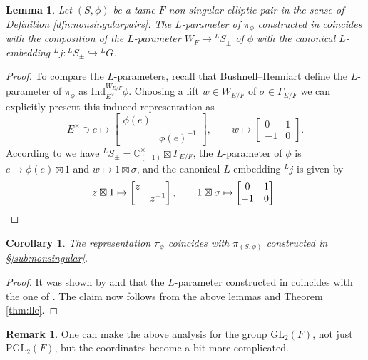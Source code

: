 \documentclass{article}
\def\tx#1{\textrm{#1}}
\def\C{\mathbb{C}}
\newtheorem{lem}[thm]{Lemma}
\newtheorem{cor}[thm]{Corollary}
\theoremstyle{definition}
\newtheorem{rem}[thm]{Remark}
\numberwithin{equation}{subsection}
\renewcommand{\-}{\hyp{}}
\begin{document}
\begin{lem}
	Let $(S,\phi)$ be a tame $F$-non-singular elliptic pair in the sense of Definition \ref{dfn:nonsingularpairs}. The $L$-parameter of $\pi_\phi$ constructed in \cite[Theorem 40.1]{BH06} coincides with the composition of the $L$-parameter $W_F \to {^LS}_\pm$ of $\phi$ with the canonical $L$-embedding $^Lj : {^LS}_\pm \hookrightarrow {^LG}$.
\end{lem}
\begin{proof}
To compare the $L$-parameters, recall that Bushnell--Henniart define the $L$-parameter of $\pi_\phi$ as $\tx{Ind}_{E^\times}^{W_{E/F}}\phi$. Choosing a lift $w \in W_{E/F}$ of $\sigma \in \Gamma_{E/F}$ we can explicitly present this induced representation as 
	\[ E^\times \ni e \mapsto \begin{bmatrix}
		\phi(e)\\&\phi(e)^{-1}
	\end{bmatrix},\qquad w \mapsto \begin{bmatrix}
		0&1\\-1&0
	\end{bmatrix}.\]
	According to \cite[Appendix B.2]{KalDC} we have $^LS_\pm = \C^\times_{(-1)}\boxtimes \Gamma_{E/F}$, the $L$-parameter of $\phi$ is $e \mapsto \phi(e)\boxtimes 1$ and $w \mapsto 1 \boxtimes \sigma$, and the canonical $L$-embedding $^Lj$ is given by 
	\[ z \boxtimes 1 \mapsto \begin{bmatrix}
		z\\&z^{-1}
	\end{bmatrix},\qquad 1 \boxtimes \sigma \mapsto \begin{bmatrix}
		0&1\\-1&0
	\end{bmatrix}. \qedhere\]
\end{proof}

\begin{cor}
	The representation $\pi_\phi$ coincides with $\pi_{(S,\phi)}$ constructed in \S\ref{sub:nonsingular}.
\end{cor}
\begin{proof}
	It was shown by \cite{OT21} and \cite{Tok2023} that the $L$-parameter constructed in \cite{KalRSP} coincides with the one of \cite{BH06}. The claim now follows from the above lemmas and Theorem \ref{thm:llc}.
\end{proof}

\begin{rem}
One can make the above analysis for the group $\tx{GL}_2(F)$, not just $\tx{PGL}_2(F)$, but the coordinates become a bit more complicated.
		
\end{rem}
\end{document}
